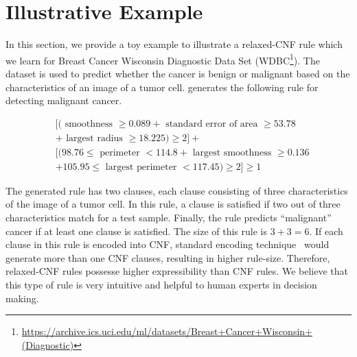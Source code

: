 


\section{Illustrative Example}
\label{sec:example}

In this section, we provide a toy example to illustrate  a relaxed-CNF rule which we learn for  Breast Cancer Wisconsin Diagnostic Data Set (WDBC\footnote{\url{https://archive.ics.uci.edu/ml/datasets/Breast+Cancer+Wisconsin+(Diagnostic)}}). The dataset is used to predict whether the cancer is benign or malignant based on the characteristics of an image of  a tumor cell.  {\Framework} generates the following rule for detecting malignant cancer. 

\[
\begin{split}
&[ (  \text{ smoothness }\ge 0.089  + \text{ standard error of area  }\ge 53.78 \\
& + \text{ largest radius }\ge 18.225   )\ge 2  ] +\\
&[   (98.76\le \text{ perimeter } < 114.8  +  \text{ largest smoothness }\ge 0.136 \\
& + 105.95 \le \text{ largest perimeter }  < 117.45     )\ge 2  ]  \ge 1 \end{split}
\]

The generated rule has two clauses, each clause consisting of three characteristics of the image of a tumor cell. In this rule, a clause is satisfied if two out of three characteristics match for a test sample. Finally, the rule predicts ``malignant'' cancer if at least one clause is satisfied. The size of this rule is $ 3+3=6 $.  If each clause in this rule is encoded into CNF,  standard encoding technique~\cite{steinke2014pblib} would generate more than one CNF clauses, resulting in higher rule-size. Therefore,   relaxed-CNF rules possesse higher expressibility than  CNF rules. 
We believe that this type of rule is very intuitive and helpful to human experts in decision making.  
	


